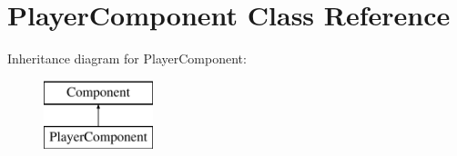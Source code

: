 \hypertarget{class_player_component}{\section{Player\+Component Class Reference}
\label{class_player_component}
}
Inheritance diagram for Player\+Component\+:\begin{figure}[H]
\begin{center}
\leavevmode
\includegraphics[height=2.000000cm]{class_player_component}
\end{center}
\end{figure}
